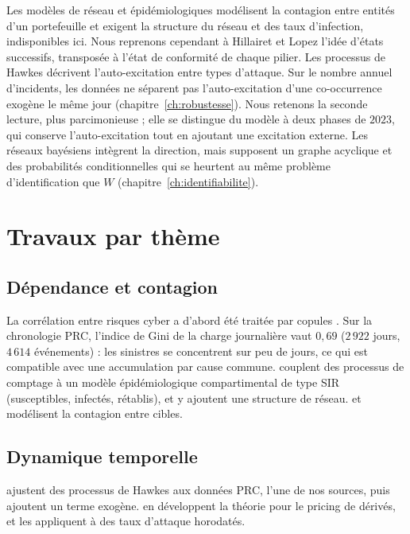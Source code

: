 Les modèles de réseau et épidémiologiques \citep{HillairetLopez2021,
HillairetLopezDOultremontSpoorenberg2022, XuHua2017, Baldwin2017} modélisent la contagion entre
entités d'un portefeuille et exigent la structure du réseau et des taux d'infection, indisponibles
ici. Nous reprenons cependant à Hillairet et Lopez l'idée d'états successifs, transposée à l'état de conformité de chaque pilier. Les processus de Hawkes \citep{BessyRolandBoumezouedHillairet2021, BoumezouedCherkaouiHillairet2023}
décrivent l'auto-excitation entre types d'attaque. Sur le nombre annuel d'incidents, les données ne séparent pas l'auto-excitation d'une co-occurrence exogène le même jour (chapitre~\ref{ch:robustesse}). Nous retenons la seconde lecture, plus parcimonieuse ; elle se distingue du modèle à deux phases de $2023$, qui conserve l'auto-excitation tout en ajoutant une excitation externe. Les réseaux bayésiens intègrent la direction, mais supposent un graphe acyclique
et des probabilités conditionnelles qui se heurtent au même problème d'identification que $W$
(chapitre~\ref{ch:identifiabilite}).

\section{Travaux par thème}

\subsection*{Dépendance et contagion}
La corrélation entre risques cyber a d'abord été traitée par
copules \citep{BohmeKataria2006, HerathHerath2011}. Sur la chronologie PRC, l'indice de Gini de la charge journalière vaut $0{,}69$ ($2\,922$ jours, $4\,614$ événements) : les sinistres se concentrent sur peu de jours, ce qui est compatible avec une accumulation par cause commune.
\citet{HillairetLopez2021} couplent des processus de comptage à un modèle épidémiologique
compartimental de type SIR (susceptibles, infectés, rétablis), et \citet{HillairetLopezDOultremontSpoorenberg2022} y ajoutent une
structure de réseau. \citet{XuHua2017} et \citet{Baldwin2017} modélisent la contagion entre cibles.

\subsection*{Dynamique temporelle}
\citet{BessyRolandBoumezouedHillairet2021} ajustent des processus de
Hawkes aux données PRC, l'une de nos sources, puis \citet{BoumezouedCherkaouiHillairet2023}
ajoutent un terme exogène. \citet{HillairetReveillacRosenbaum2021} en développent la théorie pour le
pricing de dérivés, et \citet{Peng2016} les appliquent à des taux d'attaque horodatés.


